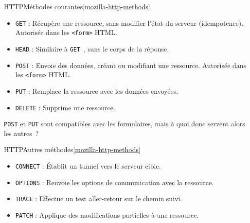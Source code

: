 \documentclass{beamer}
\begin{document}
    \begin{frame}{HTTP}{Méthodes courantes\cref{mozilla-http-methods}}
        \begin{itemize}
            \item \lstinline{GET} : Récupère une ressource, sans modifier l'état du serveur (idempotence).
            Autorisée dans les \lstinline{<form>} HTML.
            \item \lstinline{HEAD} : Similaire à \lstinline{GET}~, sans le corps de la réponse.
            \item \lstinline{POST} : Envoie des données, créant ou modifiant une ressource.
            Autorisée dans les \lstinline{<form>} HTML.
            \item \lstinline{PUT} : Remplace la ressource avec les données envoyées.
            \item \lstinline{DELETE} : Supprime une ressource.
        \end{itemize}
        \begin{dangercolorbox}
            \lstinline{POST} et \lstinline{PUT} sont compatibles avec les formulaires, mais à quoi donc servent alors les autres~?
        \end{dangercolorbox}
    \end{frame}

    \begin{frame}{HTTP}{Autres méthodes\cref{mozilla-http-methods}}
        \begin{itemize}
            \item \lstinline{CONNECT} : Établit un tunnel vers le serveur cible.
            \item \lstinline{OPTIONS} : Renvoie les options de communication avec la ressource.
            \item \lstinline{TRACE} : Effectue un test aller-retour sur le chemin suivi.
            \item \lstinline{PATCH} : Applique des modifications partielles à une ressource.
        \end{itemize}
    \end{frame}
\end{document}
